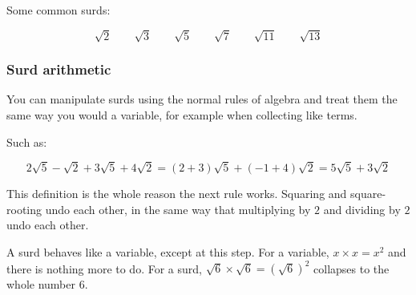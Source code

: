
Some common surds:

\[ \sqrt{2} \qquad \sqrt{3} \qquad \sqrt{5} \qquad \sqrt{7} \qquad \sqrt{11} \qquad \sqrt{13} \]

\subsubsection{Surd arithmetic}

You can manipulate surds using the normal rules of algebra and treat them the same way you would a variable, for example when collecting like terms.

Such as:

\[
  2\sqrt{5} - \sqrt{2} + 3\sqrt{5} + 4\sqrt{2} = (2 + 3)\sqrt{5} + (-1 + 4)\sqrt{2} = 5\sqrt{5} + 3\sqrt{2}
\]


This definition is the whole reason the next rule works. Squaring and square-rooting undo each other, in the same way that multiplying by $2$ and dividing by $2$ undo each other.


A surd behaves like a variable, except at this step. For a variable, $x \times x = x^{2}$ and there is nothing more to do. For a surd, $\sqrt{6} \times \sqrt{6} = \left(\sqrt{6}\right)^{2}$ collapses to the whole number $6$.

